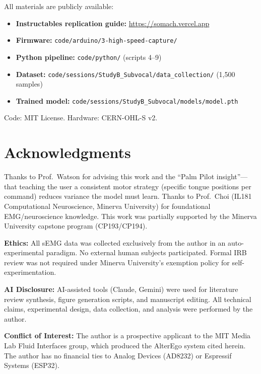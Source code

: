 \documentclass[11pt, a4paper]{article}
\begin{document}
All materials are publicly available:
\begin{itemize}
    \item \textbf{Instructables replication guide:} \url{https://somach.vercel.app}
    \item \textbf{Firmware:} \texttt{code/arduino/3-high-speed-capture/}
    \item \textbf{Python pipeline:} \texttt{code/python/} (scripts 4--9)
    \item \textbf{Dataset:} \texttt{code/sessions/StudyB\_Subvocal/data\_collection/} (1{,}500 samples)
    \item \textbf{Trained model:} \texttt{code/sessions/StudyB\_Subvocal/models/model.pth}
\end{itemize}
Code: MIT License. Hardware: CERN-OHL-S v2.

\section*{Acknowledgments}

Thanks to Prof.\ Watson for advising this work and the ``Palm Pilot insight''---that teaching the user a consistent motor strategy (specific tongue positions per command) reduces variance the model must learn. Thanks to Prof.\ Choi (IL181 Computational Neuroscience, Minerva University) for foundational EMG/neuroscience knowledge. This work was partially supported by the Minerva University capstone program (CP193/CP194).

\textbf{Ethics:} All sEMG data was collected exclusively from the author in an auto-experimental paradigm. No external human subjects participated. Formal IRB review was not required under Minerva University's exemption policy for self-experimentation.

\textbf{AI Disclosure:} AI-assisted tools (Claude, Gemini) were used for literature review synthesis, figure generation scripts, and manuscript editing. All technical claims, experimental design, data collection, and analysis were performed by the author.

\textbf{Conflict of Interest:} The author is a prospective applicant to the MIT Media Lab Fluid Interfaces group, which produced the AlterEgo system cited herein. The author has no financial ties to Analog Devices (AD8232) or Espressif Systems (ESP32).
\end{document}
